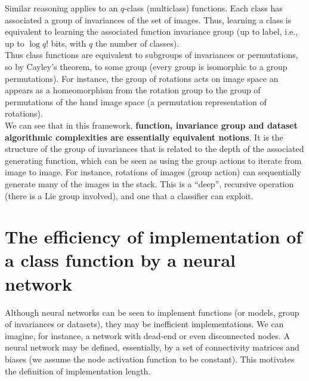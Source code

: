 \documentclass[11pt]{amsart}
\newcommand{\inputspace}{\mathcal X}
\begin{document}
Similar reasoning applies to  an $q$-class (multiclass) functions.  Each class has associated a group of invariances of the set of images.  Thus, learning a class is equivalent to learning the associated function invariance group (up to label, i.e., up to $\log q!$ bits, with $q$ the number of classes).\\

Thus class functions are equivalent to subgroups of invariances or permutations, so by Cayley's theorem, to some group (every group is isomorphic to a group permutations). For instance, the group of rotations acts on image space an appears as a homeomorphism from the rotation group to the group of permutations of the hand image space (a permutation representation of rotations). \\

We can see that in this framework,  {\bf function, invariance group and dataset algorithmic complexities are essentially equivalent notions}.  It is the structure of the group of invariances that is related to the depth of the associated generating function, which can be seen as using the group actions to iterate from image to image. For instance, rotations of images (group action) can sequentially generate many of the images in the stack. This is a ``deep'', recursive operation (there is a Lie group involved), and one that a classifier can exploit.



\section{The efficiency of implementation of a class function by a neural network}
Although neural networks can be seen to implement functions (or models, group of invariances or datasets), they may be inefficient implementations. We can imagine, for instance, a network with  dead-end or even disconnected nodes.  A neural network may be defined, essentially, by a set of connectivity matrices and biases  (we assume the node activation  function to be constant).  This motivates the definition of implementation length. \\
\end{document}
